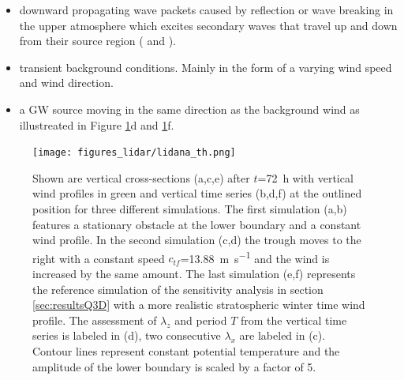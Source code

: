 \begin{itemize}
    \item downward propagating wave packets caused by reflection or wave breaking in the upper atmosphere which excites secondary waves that travel up and down from their source region (\cite[]{dornbrack_interpretation_2017} and \cite[]{vadas_mechanism_2003}).

    \item transient background conditions. Mainly in the form of a varying wind speed and wind direction.

    \item a GW source moving in the same direction as the background wind as illustreated in Figure \ref{fig:lidar_sim}d and \ref{fig:lidar_sim}f.
\end{itemize}

\begin{figure}[tbp]
    \centering
    \texttt{[image: figures\_lidar/lidana\_th.png]}
    \caption{Shown are vertical cross-sections (a,c,e) after $t$=\SI{72}{\hour} with vertical wind profiles in green and vertical time series (b,d,f) at the outlined position for three different simulations. The first simulation (a,b) features a stationary obstacle at the lower boundary and a constant wind profile. In the second simulation (c,d) the trough moves to the right with a constant speed $c_{tf}$=\SI{13.88}{\meter \per \second} and the wind is increased by the same amount. The last simulation (e,f) represents the reference simulation of the sensitivity analysis in section \ref{sec:resultsQ3D} with a more realistic stratospheric winter time wind profile. The assessment of $\lambda_z$ and period $T$ from the vertical time series is labeled in (d), two consecutive $\lambda_x$ are labeled in (c). Contour lines represent constant potential temperature and the amplitude of the lower boundary is scaled by a factor of 5.}
    \label{fig:lidar_sim}
\end{figure}

